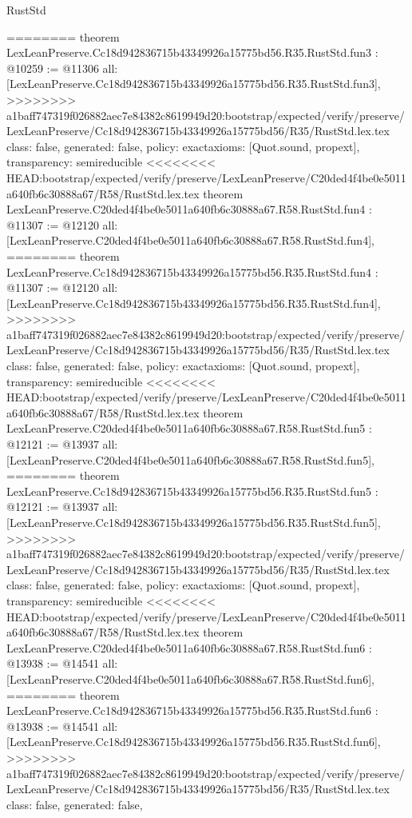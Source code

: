 \begin{lexlean}{RustStd}
\begin{coremodule}
{\begin{coremodule}
{{{{{{========
theorem LexLeanPreserve.Cc18d942836715b43349926a15775bd56.R35.RustStd.fun3 : @10259 := @11306 {
  all: [LexLeanPreserve.Cc18d942836715b43349926a15775bd56.R35.RustStd.fun3],
>>>>>>>> a1baff747319f026882aec7e84382c8619949d20:bootstrap/expected/verify/preserve/LexLeanPreserve/Cc18d942836715b43349926a15775bd56/R35/RustStd.lex.tex
  class: false,
  generated: false,
  policy: exact{axioms: [Quot.sound, propext]},
  transparency: semireducible
}
<<<<<<<< HEAD:bootstrap/expected/verify/preserve/LexLeanPreserve/C20ded4f4be0e5011a640fb6c30888a67/R58/RustStd.lex.tex
theorem LexLeanPreserve.C20ded4f4be0e5011a640fb6c30888a67.R58.RustStd.fun4 : @11307 := @12120 {
  all: [LexLeanPreserve.C20ded4f4be0e5011a640fb6c30888a67.R58.RustStd.fun4],
========
theorem LexLeanPreserve.Cc18d942836715b43349926a15775bd56.R35.RustStd.fun4 : @11307 := @12120 {
  all: [LexLeanPreserve.Cc18d942836715b43349926a15775bd56.R35.RustStd.fun4],
>>>>>>>> a1baff747319f026882aec7e84382c8619949d20:bootstrap/expected/verify/preserve/LexLeanPreserve/Cc18d942836715b43349926a15775bd56/R35/RustStd.lex.tex
  class: false,
  generated: false,
  policy: exact{axioms: [Quot.sound, propext]},
  transparency: semireducible
}
<<<<<<<< HEAD:bootstrap/expected/verify/preserve/LexLeanPreserve/C20ded4f4be0e5011a640fb6c30888a67/R58/RustStd.lex.tex
theorem LexLeanPreserve.C20ded4f4be0e5011a640fb6c30888a67.R58.RustStd.fun5 : @12121 := @13937 {
  all: [LexLeanPreserve.C20ded4f4be0e5011a640fb6c30888a67.R58.RustStd.fun5],
========
theorem LexLeanPreserve.Cc18d942836715b43349926a15775bd56.R35.RustStd.fun5 : @12121 := @13937 {
  all: [LexLeanPreserve.Cc18d942836715b43349926a15775bd56.R35.RustStd.fun5],
>>>>>>>> a1baff747319f026882aec7e84382c8619949d20:bootstrap/expected/verify/preserve/LexLeanPreserve/Cc18d942836715b43349926a15775bd56/R35/RustStd.lex.tex
  class: false,
  generated: false,
  policy: exact{axioms: [Quot.sound, propext]},
  transparency: semireducible
}
<<<<<<<< HEAD:bootstrap/expected/verify/preserve/LexLeanPreserve/C20ded4f4be0e5011a640fb6c30888a67/R58/RustStd.lex.tex
theorem LexLeanPreserve.C20ded4f4be0e5011a640fb6c30888a67.R58.RustStd.fun6 : @13938 := @14541 {
  all: [LexLeanPreserve.C20ded4f4be0e5011a640fb6c30888a67.R58.RustStd.fun6],
========
theorem LexLeanPreserve.Cc18d942836715b43349926a15775bd56.R35.RustStd.fun6 : @13938 := @14541 {
  all: [LexLeanPreserve.Cc18d942836715b43349926a15775bd56.R35.RustStd.fun6],
>>>>>>>> a1baff747319f026882aec7e84382c8619949d20:bootstrap/expected/verify/preserve/LexLeanPreserve/Cc18d942836715b43349926a15775bd56/R35/RustStd.lex.tex
  class: false,
  generated: false,
}}}}}}}}}}
\end{coremodule}}
\end{coremodule}
\end{lexlean}
